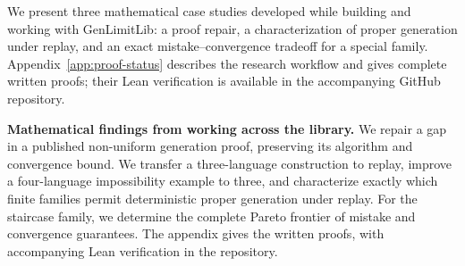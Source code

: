 
We present three mathematical case studies developed while building and working
with GenLimitLib: a proof repair, a characterization of proper generation
under replay, and an exact mistake--convergence tradeoff for a special family.
Appendix~\ref{app:proof-status} describes the research workflow and gives
complete written proofs; their Lean verification is available in the
accompanying GitHub repository.

\item \textbf{Mathematical findings from working across the library.}
We repair a gap in a published non-uniform generation proof, preserving its
algorithm and convergence bound. We transfer a three-language construction
to replay, improve a four-language impossibility example to three, and
characterize exactly which finite families permit deterministic proper
generation under replay. For the staircase family, we determine the complete
Pareto frontier of mistake and convergence guarantees. The appendix gives
the written proofs, with accompanying Lean verification in the repository.
